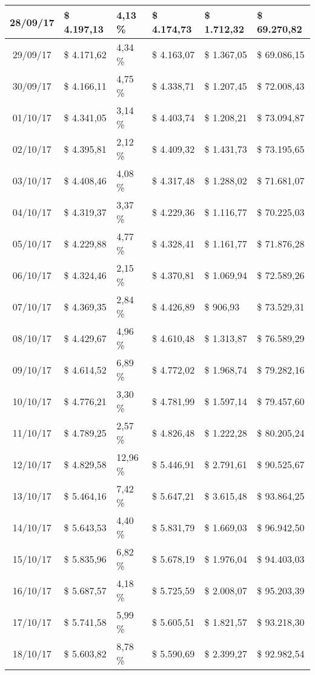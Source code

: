 \begin{small}
\begin{longtable}{|c|l|l|l|l|l|}
28/09/17 & \$ 4.197,13 & 4,13 \% & \$ 4.174,73 & \$ 1.712,32 & \$ 69.270,82 \\ \hline
29/09/17 & \$ 4.171,62 & 4,34 \% & \$ 4.163,07 & \$ 1.367,05 & \$ 69.086,15 \\ \hline
30/09/17 & \$ 4.166,11 & 4,75 \% & \$ 4.338,71 & \$ 1.207,45 & \$ 72.008,43 \\ \hline
01/10/17 & \$ 4.341,05 & 3,14 \% & \$ 4.403,74 & \$ 1.208,21 & \$ 73.094,87 \\ \hline
02/10/17 & \$ 4.395,81 & 2,12 \% & \$ 4.409,32 & \$ 1.431,73 & \$ 73.195,65 \\ \hline
03/10/17 & \$ 4.408,46 & 4,08 \% & \$ 4.317,48 & \$ 1.288,02 & \$ 71.681,07 \\ \hline
04/10/17 & \$ 4.319,37 & 3,37 \% & \$ 4.229,36 & \$ 1.116,77 & \$ 70.225,03 \\ \hline
05/10/17 & \$ 4.229,88 & 4,77 \% & \$ 4.328,41 & \$ 1.161,77 & \$ 71.876,28 \\ \hline
06/10/17 & \$ 4.324,46 & 2,15 \% & \$ 4.370,81 & \$ 1.069,94 & \$ 72.589,26 \\ \hline
07/10/17 & \$ 4.369,35 & 2,84 \% & \$ 4.426,89 & \$ 906,93 & \$ 73.529,31 \\ \hline
08/10/17 & \$ 4.429,67 & 4,96 \% & \$ 4.610,48 & \$ 1.313,87 & \$ 76.589,29 \\ \hline
09/10/17 & \$ 4.614,52 & 6,89 \% & \$ 4.772,02 & \$ 1.968,74 & \$ 79.282,16 \\ \hline
10/10/17 & \$ 4.776,21 & 3,30 \% & \$ 4.781,99 & \$ 1.597,14 & \$ 79.457,60 \\ \hline
11/10/17 & \$ 4.789,25 & 2,57 \% & \$ 4.826,48 & \$ 1.222,28 & \$ 80.205,24 \\ \hline
12/10/17 & \$ 4.829,58 & 12,96 \% & \$ 5.446,91 & \$ 2.791,61 & \$ 90.525,67 \\ \hline
13/10/17 & \$ 5.464,16 & 7,42 \% & \$ 5.647,21 & \$ 3.615,48 & \$ 93.864,25 \\ \hline
14/10/17 & \$ 5.643,53 & 4,40 \% & \$ 5.831,79 & \$ 1.669,03 & \$ 96.942,50 \\ \hline
15/10/17 & \$ 5.835,96 & 6,82 \% & \$ 5.678,19 & \$ 1.976,04 & \$ 94.403,03 \\ \hline
16/10/17 & \$ 5.687,57 & 4,18 \% & \$ 5.725,59 & \$ 2.008,07 & \$ 95.203,39 \\ \hline
17/10/17 & \$ 5.741,58 & 5,99 \% & \$ 5.605,51 & \$ 1.821,57 & \$ 93.218,30 \\ \hline
18/10/17 & \$ 5.603,82 & 8,78 \% & \$ 5.590,69 & \$ 2.399,27 & \$ 92.982,54 \\ \hline

\end{longtable}
\end{small}
